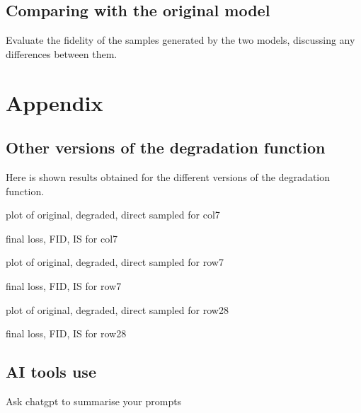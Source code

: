 \documentclass[12pt]{report} %
\begin{document}
\section{Comparing with the original model}

Evaluate the fidelity of the samples generated by the two models, discussing any differences between them.



\chapter{Appendix}

\section{Other versions of the degradation function}

Here is shown results obtained for the different versions of the degradation function.

plot of original, degraded, direct sampled for col7

final loss, FID, IS for col7

plot of original, degraded, direct sampled for row7

final loss, FID, IS for row7

plot of original, degraded, direct sampled for row28

final loss, FID, IS for row28

\section{AI tools use}

Ask chatgpt to summarise your prompts







\end{document}
